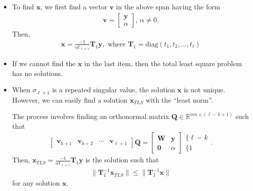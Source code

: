 \documentclass[10pt]{article}
\newcommand{\ve}[1]{\mathbf{#1}}
\newcommand{\mrm}[1]{\mathrm{#1}}
\begin{document}
\begin{itemize}
    \item To find $\ve{x}$, we first find a vector $\ve{v}$ in 
      the above span having the form
      \begin{align*}
        \ve{v} = \begin{bmatrix}
          \ve{y}\\
          \alpha
        \end{bmatrix}\mbox{, }\alpha \neq 0.
      \end{align*}
      Then,
      \begin{align*}
        \ve{x} = \frac{-1}{\alpha t_{\ell+1}} \ve{T}_1 \ve{y},
        \mbox{ where }\ve{T}_1 = \mrm{diag}(t_1, t_2, \dotsc, t_\ell)
      \end{align*}
      
    \item If we cannot find the $\ve{x}$ in the last item, then
      the total least square problem has no solutions.
      
    \item When $\sigma_{\ell+1}$ is a repeated singular value,
      the solution $\ve{x}$ is not unique. However, we can easily
      find a solution $\ve{x}_{TLS}$ with the ``least norm''.
      
      The process involves finding an orthonormal matrix 
      $\ve{Q} \in \mathbb{R}^{mn \times (\ell-k+1)}$ such that
      \begin{align*}
        \begin{bmatrix}
          \ve{v}_{k+1} & \ve{v}_{k+2} & \cdots & \ve{v}_{\ell+1}
        \end{bmatrix}
        \ve{Q}
        =
        \begin{bmatrix}
          \ve{W} & \ve{y}\\
          \ve{0} & \alpha
        \end{bmatrix}
        \begin{array}{l}
          \{ \ell - k \\ 
          \{ 1
        \end{array}.
      \end{align*}
      Then, $\ve{x}_{TLS} = \frac{-1}{\alpha t_{\ell+1}} \ve{T}_1 \ve{y}$
      is the solution such that
      \begin{align*}
        \| \ve{T}^{-1}_1 \ve{x}_{TLS} \| \leq \| \ve{T}^{-1}_1 \ve{x} \|
      \end{align*}
      for any solution $\ve{x}$.
  \end{itemize}  
  
\end{document}
